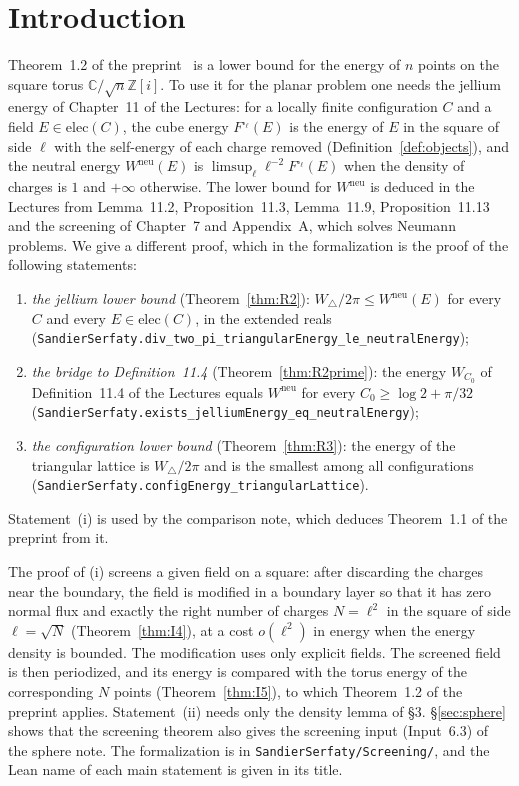 \documentclass[11pt]{article}
\theoremstyle{definition}
\theoremstyle{remark}
\newcommand{\C}{\mathbb C}
\newcommand{\Z}{\mathbb Z}
\newcommand{\Wneu}{W^{\mathrm{neu}}}
\begin{document}
\section*{Introduction}
Theorem~1.2 of the preprint~\cite{Preprint} is a lower bound for the energy of $n$ points on the square torus
$\C/\sqrt n\Z[i]$.  To use it for the planar problem one needs the jellium energy of Chapter~11 of the
Lectures: for a locally finite configuration $C$ and a field $E\in\mathrm{elec}(C)$, the cube energy
$F^{\square_\ell}(E)$ is the energy of $E$ in the square of side $\ell$ with the self-energy of each charge
removed (Definition~\ref{def:objects}), and the neutral energy $\Wneu(E)$ is $\limsup_\ell\ell^{-2}F^{\square_\ell}(E)$ when
the density of charges is $1$ and $+\infty$ otherwise.  The lower bound for $\Wneu$ is deduced in the Lectures from
Lemma~11.2, Proposition~11.3, Lemma~11.9, Proposition~11.13 and the screening of Chapter~7 and Appendix~A, which
solves Neumann problems.  We give a different proof, which in the formalization is the proof of the following
statements:
\begin{enumerate}[label=(\roman*)]
\item \emph{the jellium lower bound} (Theorem~\ref{thm:R2}): $W_\triangle/2\pi\le\Wneu(E)$ for every $C$ and every
$E\in\mathrm{elec}(C)$, in the extended reals
(\texttt{SandierSerfaty.div\_two\_pi\_triangularEnergy\_le\_neutralEnergy});
\item \emph{the bridge to Definition~11.4} (Theorem~\ref{thm:R2prime}): the energy $W_{C_0}$ of Definition~11.4 of the
Lectures equals $\Wneu$ for every $C_0\ge\log2+\pi/32$
(\texttt{SandierSerfaty.exists\_jelliumEnergy\_eq\_neutralEnergy});
\item \emph{the configuration lower bound} (Theorem~\ref{thm:R3}): the energy of the triangular lattice is
$W_\triangle/2\pi$ and is the smallest among all configurations
(\texttt{SandierSerfaty.configEnergy\_triangularLattice}).
\end{enumerate}
Statement~(i) is used by the comparison note, which deduces Theorem~1.1 of the preprint from it.

The proof of (i) screens a given field on a square: after discarding the charges near the boundary, the
field is modified in a boundary layer so that it has zero normal flux and exactly the right number of charges
$N=\ell^2$ in the square of side $\ell=\sqrt N$ (Theorem~\ref{thm:I4}), at a cost $o(\ell^2)$ in energy when the energy
density is bounded.  The modification uses only explicit fields.  The screened field is then periodized, and its
energy is compared with the torus energy of the corresponding $N$ points (Theorem~\ref{thm:I5}), to which
Theorem~1.2 of the preprint applies.  Statement~(ii) needs only the density lemma of \S3.  \S\ref{sec:sphere} shows
that the screening theorem also gives the screening input (Input~6.3) of the sphere note.  The formalization
is in \texttt{SandierSerfaty/Screening/}, and the Lean name of each main statement is given in its title.
\end{document}
